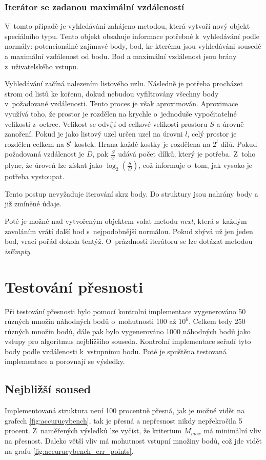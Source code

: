 \subsubsection{Iterátor se zadanou maximální vzdáleností}
V~tomto případě je vyhledávání zahájeno metodou, která vytvoří nový objekt speciálního typu. Tento objekt obsahuje informace potřebné k~vyhledávání podle normály: potencionálně zajímavé body, bod, ke kterému jsou vyhledáváni sousedé a maximální vzdálenost od bodu. Bod a maximální vzdálenost jsou brány z~uživatelského vstupu.

Vyhledávání začíná nalezením listového uzlu. Následně je potřeba procházet strom od listů ke kořenu, dokud nebudou vyfiltrovány všechny body v~požadované vzdálenosti. Tento proces je však aproximován. Aproximace využívá toho, že prostor je rozdělen na krychle o~jednoduše vypočitatelné velikosti z~octree. Velikost se odvíjí od celkové velikosti prostoru $S$ a úrovně zanoření. Pokud je jako listový uzel určen uzel na úrovni $l$, celý prostor je rozdělen celkem na $8^l$ kostek. Hrana každé kostky je rozdělena na $2^l$ dílů. Pokud požadovaná vzdálenost je $D$, pak $\frac{S}{2^l}$ udává počet dílků, který je potřeba. Z~toho plyne, že úroveň lze získat jako $\log_2\left(\frac{S}{D}\right)$, což informuje o~tom, jak vysoko je potřeba vystoupat.

Tento postup nevyžaduje iterování skrz body. Do struktury jsou nahrány body a již zmíněné údaje.

Poté je možné nad vytvořeným objektem volat metodu \emph{next}, která s~každým zavoláním vrátí další bod s~nejpodobnější normálou. Pokud zbývá už jen jeden bod, vrací pořád dokola tentýž. O~prázdnosti iterátoru se lze dotázat metodou \emph{isEmpty}.


\section{Testování přesnosti}
\label{presnost}

Při testování přesnosti bylo pomocí kontrolní implementace vygenerováno 50 různých množin náhodných bodů o~mohutnosti $100$ až $10^6$. Celkem tedy 250 různých množin bodů, dále pak bylo vygenerováno 1000 náhodných bodů jako vstupy pro algoritmus nejbližšího souseda. Kontrolní implementace seřadí tyto body podle vzdálenosti k~vstupnímu bodu. Poté je spuštěna testovaná implementace a porovnají se výsledky.

\subsection*{Nejbližší soused}
Implementovaná struktura není 100 procentně přesná, jak je možné vidět na grafech \ref{fig:accurucybench}, tak je přesná a nepřesnost  nikdy nepřekročila 5 procent. Z~naměřených výsledků lze vyčíst, že kriterium $M_{max}$ má minimální vliv na přesnost. Daleko větší vliv má mohutnost vstupní množiny bodů, což jde vidět na grafu \ref{fig:accurucybench_err_points}.

